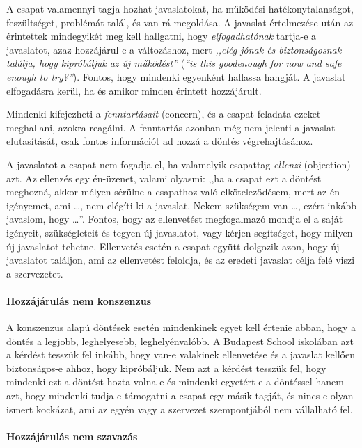 A csapat valamennyi tagja hozhat javaslatokat, ha működési
hatékonytalanságot, feszültséget, problémát talál, és van rá megoldása. A
javaslat értelmezése után az érintettek mindegyikét meg kell hallgatni,
hogy \emph{elfogadhatónak} tartja-e a javaslatot, azaz hozzájárul-e a
változáshoz, mert \emph{,,elég jónak és biztonságosnak találja, hogy
kipróbáljuk az új működést''} (\emph{``is this good\break enough for now and
safe enough to try?''}). Fontos, hogy mindenki egyenként hallassa
hangját. A javaslat elfogadásra kerül, ha és amikor minden érintett
hozzájárult.

Mindenki kifejezheti a \emph{fenntartásait} (concern), és a csapat
feladata ezeket meghallani, azokra reagálni. A fenntartás azonban még
nem jelenti a javaslat elutasítását, csak fontos információt ad hozzá a
döntés végrehajtásához.

A javaslatot a csapat nem fogadja el, ha valamelyik csapattag
\emph{ellenzi} (objection) azt. Az ellenzés egy én-üzenet, valami
olyasmi: ,,ha a csapat ezt a döntést meghozná, akkor mélyen sérülne a
csapathoz való elköteleződésem, mert az én igényemet, ami \ldots{}, nem
elégíti ki a javaslat. Nekem szükségem van \ldots{}, ezért inkább
javaslom, hogy \ldots{}''. Fontos, hogy az ellenvetést megfogalmazó
mondja el a saját igényeit, szükségleteit és tegyen új javaslatot, vagy
kérjen segítséget, hogy milyen új javaslatot tehetne. Ellenvetés esetén
a csapat együtt dolgozik azon, hogy új javaslatot találjon, ami az
ellenvetést feloldja, és az eredeti javaslat célja felé viszi a
szervezetet.


\paragraph{Hozzájárulás nem
konszenzus}

A konszenzus alapú döntések esetén mindenkinek egyet kell értenie abban,
hogy a döntés a legjobb, leghelyesebb, leghelyénvalóbb. A Budapest
School iskolában azt a kérdést tesszük fel inkább, hogy van-e valakinek
ellenvetése és a javaslat kellően biztonságos-e ahhoz, hogy kipróbáljuk.
Nem azt a kérdést tesszük fel, hogy mindenki ezt a döntést hozta volna-e
és mindenki egyetért-e a döntéssel hanem azt, hogy mindenki tudja-e
támogatni a csapat egy másik tagját, és nincs-e olyan ismert kockázat,
ami az egyén vagy a szervezet szempontjából nem vállalható fel.


\paragraph{Hozzájárulás nem
szavazás}

